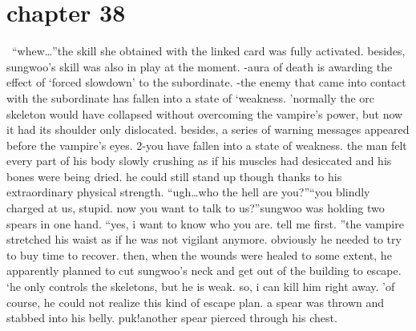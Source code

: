\section{chapter 38}






 “whew…”the skill she obtained with the linked card was fully activated.
besides, sungwoo’s skill was also in play at the moment.
-aura of death is awarding the effect of ‘forced slowdown’ to the subordinate.
-the enemy that came into contact with the subordinate has fallen into a state of ‘weakness.
’normally the orc skeleton would have collapsed without overcoming the vampire’s power, but now it had its shoulder only dislocated.
besides, a series of warning messages appeared before the vampire’s eyes.
2-you have fallen into a state of weakness.
the man felt every part of his body slowly crushing as if his muscles had desiccated and his bones were being dried.
 he could still stand up though thanks to his extraordinary physical strength.
“ugh…who the hell are you?”“you blindly charged at us, stupid.
 now you want to talk to us?”sungwoo was holding two spears in one hand.
“yes, i want to know who you are.
 tell me first.
”the vampire stretched his waist as if he was not vigilant anymore.
obviously he needed to try to buy time to recover.
 then, when the wounds were healed to some extent, he apparently planned to cut sungwoo’s neck and get out of the building to escape.
‘he only controls the skeletons, but he is weak.
 so, i can kill him right away.
’of course, he could not realize this kind of escape plan.
a spear was thrown and stabbed into his belly.
puk!another spear pierced through his chest.

